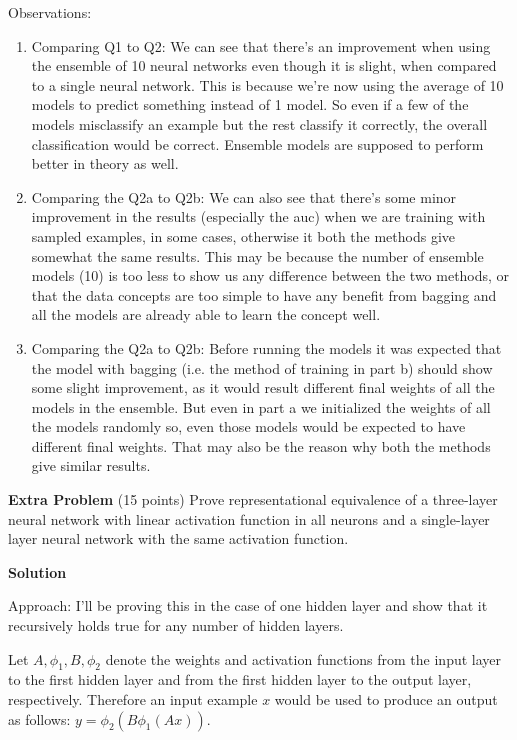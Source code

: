 \documentclass[twoside]{article}
\begin{document}
Observations:
\begin{enumerate}
	\item Comparing Q1 to Q2: We can see that there's an improvement when using the ensemble of 10 neural networks even though it is slight, when compared to a single neural network. This is because we're now using the average of 10 models to predict something instead of 1 model. So even if a few of the models misclassify an example but the rest classify it correctly, the overall classification would be correct. Ensemble models are supposed to perform better in theory as well.\\
	\item Comparing the Q2a to Q2b: We can also see that there's some minor improvement in the results (especially the auc) when we are training with sampled examples, in some cases, otherwise it both the methods give somewhat the same results. This may be because the number of ensemble models (10) is too less to show us any difference between the two methods, or that the data concepts are too simple to have any benefit from bagging and all the models are already able to learn the concept well.
	\item Comparing the Q2a to Q2b: Before running the models it was expected that the model with bagging (i.e. the method of training in part b) should show some slight improvement, as it would result different final weights of all the models in the ensemble. But even in part a we initialized the weights of all the models randomly so, even those models would be expected to have different final weights. That may also be the reason why both the methods give similar results.
\end{enumerate}


\textbf{Extra Problem} (15 points) Prove representational equivalence of a three-layer neural network with linear activation function in all neurons and a single-layer layer neural network with the same activation function.

\textbf{Solution}

Approach: I'll be proving this in the case of one hidden layer and show that it recursively holds true for any number of hidden layers.

Let $A, \phi_1, B, \phi_2$ denote the weights and activation functions from the input layer to the first hidden layer and from the first hidden layer to the output layer, respectively. Therefore an input example $x$ would be used to produce an output as follows: $y = \phi_2 (B \phi_1 (Ax))$.
 
\end{document}
